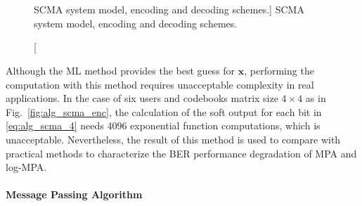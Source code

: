 \begin{figure}[htp]
  \centering
  \\
  \\
  \quad
  \caption
    [SCMA system model, encoding and decoding schemes.]
    {SCMA system model, encoding and decoding schemes.}
  \label{fig:alg_scma}
\end{figure}

Although the ML method provides the best guess for $\bm{\hat{x}}$, performing
the computation with this method requires unacceptable complexity in real
applications. In the case of six users and codebooks matrix size $4\times4$ as
in Fig.~\ref{fig:alg_scma_enc}, the calculation of the soft output for each bit
in \eqref{eq:alg_scma_4} needs 4096 exponential function computations, which is
unacceptable. Nevertheless, the result of this method is used to compare with
practical methods to characterize the BER performance degradation of MPA and
log-MPA.

\paragraph{Message Passing Algorithm}
\label{sec:alg_scma_mpa}

